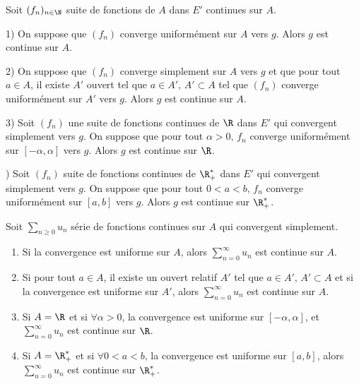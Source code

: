 \begin{theoreme}{}{}
    Soit $(f_n)_{n \in \N}$ suite de fonctions de $A$ dans $E'$ continues sur $A$. 
    
    1) On suppose que $(f_n)$ converge uniformément sur $A$ vers $g$. Alors $g$ est continue sur $A$.


    2) On suppose que $(f_n)$ converge simplement sur $A$ vers $g$ et que pour tout $a \in A$,
    il existe $A'$ ouvert tel que $a \in A', \, A' \subset A$ tel que $(f_n)$ converge uniformément sur $A'$ vers $g$.
    Alors $g$ est continue sur $A$.


    3) Soit $(f_n)$ une suite de fonctions continues de $\R$ dans $E'$ qui convergent simplement vers $g$. 
    On suppose que pour tout $\alpha > 0, \, f_n$ converge uniformément sur $[-\alpha, \alpha]$ vers $g$.
    Alors $g$ est continue sur $\R$.

    ) Soit $(f_n)$ suite de fonctions continues de $\R_+^*$ dans $E'$ qui convergent simplement vers $g$. 
    On suppose que pour tout $0<a<b, \, f_n$ converge uniformément sur $[a, b]$ vers $g$.
    Alors $g$ est continue sur $\R_+^*$.
\end{theoreme}

\begin{theoreme}{}{}
    Soit $\sum_{n \geqslant 0 } u_n$ série de fonctions continues sur $A$ qui convergent 
    simplement. 

    \begin{enumerate}
        \item Si la convergence est uniforme sur $A$, alors $\displaystyle \sum_{n = 0}^{\infty} u_n$ est continue sur $A$.
        \item Si pour tout $a \in A$, il existe un ouvert relatif $A'$ tel que $a \in A', \, A' \subset A$ et
        si la convergence est uniforme sur $A'$, alors $\displaystyle \sum_{n = 0}^{\infty} u_n$ est continue sur $A$.
        \item Si $A = \R$ et si $\forall \alpha > 0$, la convergence est uniforme sur $[-\alpha, \alpha]$, 
        et $\displaystyle \sum_{n = 0}^{\infty} u_n$ est continue sur $\R$.
        \item Si $A = \R_+^*$ et si $\forall 0 < a < b$, la convergence est uniforme sur $[a, b]$,
        alors $\displaystyle \sum_{n = 0}^{\infty} u_n$ est continue sur $\R_+^*$.
    \end{enumerate}
\end{theoreme}

